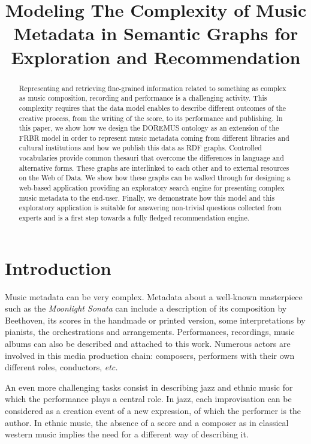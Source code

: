 \documentclass{article}
\title{Modeling The Complexity of Music Metadata in Semantic Graphs for Exploration and Recommendation}
\begin{document}
\maketitle


\begin{abstract}
Representing and retrieving fine-grained information related to something as complex as music composition, recording and performance is a challenging activity. This complexity requires that the data model enables to describe different outcomes of the creative process, from the writing of the score, to its performance and publishing. In this paper, we show how we design the DOREMUS ontology as an extension of the FRBR model in order to represent music metadata coming from different libraries and cultural institutions and how we publish this data as RDF graphs. Controlled vocabularies provide common thesauri that overcome the differences in language and alternative forms. These graphs are interlinked to each other and to external resources on the Web of Data. We show how these graphs can be walked through for designing a web-based application providing an exploratory search engine for presenting complex music metadata to the end-user. Finally, we demonstrate how this model and this exploratory application is suitable for answering non-trivial questions collected from experts and is a first step towards a fully fledged recommendation engine.
\end{abstract}


\section{Introduction}\label{sec:introduction}
Music metadata can be very complex. Metadata about a well-known masterpiece such as the \textit{Moonlight Sonata} can include a description of its composition by Beethoven, its scores in the handmade or printed version, some interpretations by pianists, the orchestrations and arrangements. Performances, recordings, music albums can also be described and attached to this work. Numerous actors are involved in this media production chain: composers, performers with their own different roles, conductors, {\it etc.}

An even more challenging tasks consist in describing jazz and ethnic music for which the performance plays a central role. In jazz, each improvisation can be considered as a creation event of a new expression, of which the performer is the author. In ethnic music, the absence of a score and a composer as in classical western music implies the need for a different way of describing it.
\end{document}
